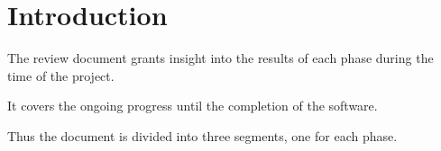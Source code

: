 \section{Introduction}
The review document grants insight into the results of each phase during the time of the project.

It covers the ongoing progress until the completion of the software.

Thus the document is divided into three segments, one for each phase.    